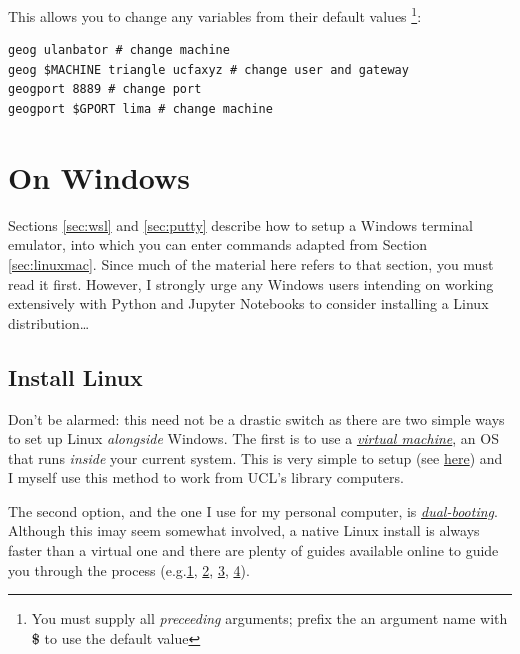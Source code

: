 \documentclass[a4paper]{article}
\begin{document}
This allows you to change any variables from their default values \footnote{You must supply all \emph{preceeding} arguments; prefix the an argument name with \textbf{\$} to use the default value}:

\begin{lstlisting}[caption={Examples of arguments to geography login/tunnel functions}, label={lst:gfuncsargseg}]
geog ulanbator # change machine
geog $MACHINE triangle ucfaxyz # change user and gateway
geogport 8889 # change port
geogport $GPORT lima # change machine
\end{lstlisting}

\section{On Windows}
\label{sec:windows}

Sections \ref{sec:wsl} and \ref{sec:putty} describe how to setup a Windows terminal emulator, into which you can enter commands adapted from Section \ref{sec:linuxmac}.
Since much of the material here refers to that section, you must read it first.
However, I strongly urge any Windows users intending on working extensively with Python and Jupyter Notebooks to consider installing a Linux distribution\ldots

\subsection{Install Linux}
\label{sec:win2lnx}
Don't be alarmed: this need not be a drastic switch as there are two simple ways to set up Linux \emph{alongside} Windows.
The first is to use a \emph{\href{https://www.howtogeek.com/196060/beginner-geek-how-to-create-and-use-virtual-machines/}{virtual machine}}, an OS that runs \emph{inside} your current system.
This is very simple to setup (see \href{http://www.storagecraft.com/blog/the-dead-simple-guide-to-installing-a-linux-virtual-machine-on-windows/}{here}) and I myself use this method to work from UCL's library computers.

The second option, and the one I use for my personal computer, is \emph{\href{https://www.howtogeek.com/187789/dual-booting-explained-how-you-can-have-multiple-operating-systems-on-your-computer/}{dual-booting}}.
Although this imay seem somewhat involved, a native Linux install is always faster than a virtual one and there are plenty of guides available online to guide you through the process (e.g.\href{https://itsfoss.com/guide-install-linux-mint-16-dual-boot-windows/}{1}, \href{https://www.lifewire.com/ultimate-windows-7-ubuntu-linux-dual-boot-guide-2200.53}{2}, \href{https://www.howtogeek.com/214571/how-to-dual-boot-linux-on-your-pc/}{3}, \href{http://www.pcworld.com/article/2955460/operating-systems/dual-booting-linux-with-windows-what-you-need-to-know.html}{4}). 
\end{document}
